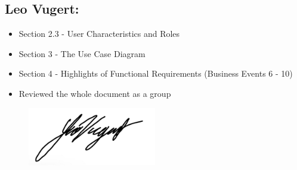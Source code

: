 \documentclass[]{article}
\begin{document}
\subsection*{Leo Vugert:}
\begin{itemize}
	\item Section 2.3 - User Characteristics and Roles
	\item Section 3 - The Use Case Diagram
	\item Section 4 - Highlights of Functional Requirements (Business Events 6 - 10)
	\item Reviewed the whole document as a group
\end{itemize}
\begin{figure}[h]
	\centering
	\includegraphics[width=0.5\textwidth]{LeoSignature.jpg}
	\label{fig:signature}
\end{figure}



\end{document}
